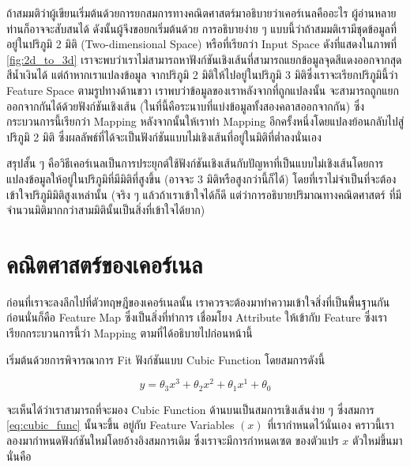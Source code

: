 ถ้าสมมติว่าผู้เขียนเริ่มต้นด้วยการยกสมการทางคณิตศาสตร์มาอธิบายว่าเคอร์เนลคืออะไร ผู้อ่านหลายท่านก็อาจจะสับสนได้ ดังนั้นผู้จึงขอยกเริ่มต้นด้วย%
การอธิบายง่าย ๆ แบบนี้ว่าถ้าสมมติเรามีชุดข้อมูลที่อยู่ในปริภูมิ 2 มิติ (Two-dimensional Space) หรือที่เรียกว่า Input Space ดังที่แสดงในภาพที่ 
\ref{fig:2d_to_3d} เราจะพบว่าเราไม่สามารถหาฟังก์ชันเชิงเส้นที่สามารถแยกข้อมูลจุดสีแดงออกจากสุดสีน้ำเงินได้ แต่ถ้าหากเราแปลงข้อมูล%
จากปริภูมิ 2 มิติให้ไปอยู่ในปริภูมิ 3 มิติซึ่งเราจะเรียกปริภูมินี้ว่า Feature Space ตามรูปทางด้านขวา เราพบว่าข้อมูลของเราหลังจากที่ถูกแปลงนั้น%
จะสามารถถูกแยกออกจากกันได้ด้วยฟังก์ชันเชิงเส้น (ในที่นี้คือระนาบที่แบ่งข้อมูลทั้งสองคลาสออกจากกัน) ซึ่งกระบวนการนี้เรียกว่า Mapping 
หลังจากนั้นให้เราทำ Mapping อีกครั้งหนึ่งโดยแปลงย้อนกลับไปสู่ปริภูมิ 2 มิติ ซึ่งผลลัพธ์ที่ได้จะเป็นฟังก์ชันแบบไม่เชิงเส้นที่อยู่ในมิติที่ต่ำลงนั่นเอง 

สรุปสั้น ๆ คือวิธีเคอร์เนลเป็นการประยุกต์ใช้ฟังก์ชันเชิงเส้นกับปัญหาที่เป็นแบบไม่เชิงเส้นโดยการแปลงข้อมูลให้อยู่ในปริภูมิที่มีมิติที่สูงขึ้น (อาจจะ 3 
มิติหรือสูงกว่านี้ก็ได้) โดยที่เราไม่จำเป็นที่จะต้องเข้าใจปริภูมิมิติสูงเหล่านั้น (จริง ๆ แล้วถ้าเราเข้าใจได้ก็ดี แต่ว่าการอธิบายปริมาณทางคณิตศาสตร์%
ที่มีจำนวนมิติมากกว่าสามมิตินั้นเป็นสิ่งที่เข้าใจได้ยาก)

\section{คณิตศาสตร์ของเคอร์เนล}
\label{sec:math_kernel}

ก่อนที่เราจะลงลึกไปที่ตัวทฤษฎีของเคอร์เนลนั้น เราควรจะต้องมาทำความเข้าใจสิ่งที่เป็นพื้นฐานกันก่อนนั่นก็คือ Feature Map ซึ่งเป็นสิ่งที่ทำการ%
เชื่อมโยง Attribute ให้เข้ากับ Feature ซึ่งเราเรียกกระบวนการนี้ว่า Mapping ตามที่ได้อธิบายไปก่อนหน้านี้

เริ่มต้นด้วยการพิจารณาการ Fit ฟังก์ชันแบบ Cubic Function โดยสมการดังนี้

\begin{equation}\label{eq:cubic_func}
    y = \theta_{3}x^{3} + \theta_{2}x^{2} + \theta_{1}x^{1} + \theta_{0}
\end{equation}

\noindent จะเห็นได้ว่าเราสามารถที่จะมอง Cubic Function ด้านบนเป็นสมการเชิงเส้นง่าย ๆ ซึ่งสมการ \ref{eq:cubic_func} นั้นจะขึ้น%
อยู่กับ Feature Variables $(x)$ ที่เรากำหนดไว้นั่นเอง คราวนี้เราลองมากำหนดฟังก์ชันใหม่โดยอ้างอิงสมการเดิม ซึ่งเราจะมีการกำหนดเซต%
ของตัวแปร $x$ ตัวใหม่ขึ้นมานั่นคือ

